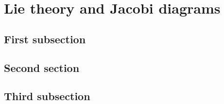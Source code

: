 \chapter{Lie theory and Jacobi diagrams}
\label{ch:lie-theory-and-jacobi-diagrams}

\section{First subsection}

\section{Second section}

\section{Third subsection}
